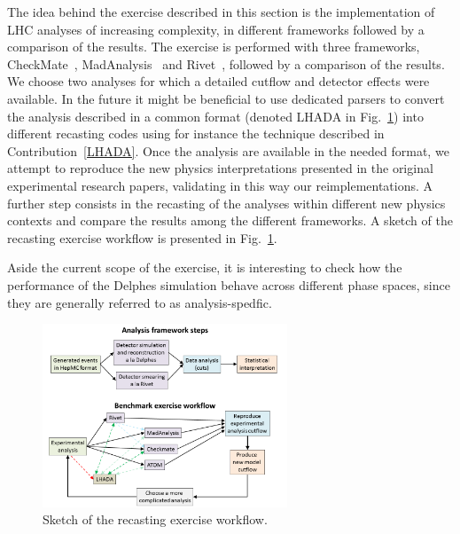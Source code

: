 \documentclass[11pt]{cernrep}
\begin{document}
The idea behind the exercise described in this section is the implementation of LHC analyses of increasing complexity, in different frameworks followed by a comparison of the results. The exercise is performed with three frameworks, CheckMate~\cite{Drees:2013wra,Cacciari:2005hq}, MadAnalysis~\cite{Conte:2012fm,Conte:2014zja,Dumont:2014tja} and Rivet~\cite{Waugh:2006ip,Buckley:2010ar}, followed by a comparison of the results. We choose two analyses for which a detailed cutflow and detector effects were available. In the future it might be beneficial to use dedicated parsers to convert the analysis described in a common format (denoted LHADA in Fig.~\ref{fig:exercise}) into different recasting codes using for instance the technique described in Contribution~\ref{LHADA}.
Once the analysis are available in the needed format, we attempt to reproduce the new physics
interpretations presented in the original experimental research papers,
validating in this way our reimplementations.
A further step consists in the recasting of the analyses within different new
physics contexts and compare the results among the different frameworks.
A sketch of the recasting exercise workflow is presented in Fig.~\ref{fig:exercise}.

Aside the current scope of the exercise, it is interesting to check how the performance of the Delphes simulation behave across different phase spaces, since they are generally referred to as analysis-spedfic.


\begin{figure}
\begin{center}
\includegraphics[width=0.65\textwidth]{figures/lhada_benchmarking_excersise.png}
 \caption{Sketch of the recasting exercise workflow.
}
\label{fig:exercise}
\end{center}
\end{figure}
\end{document}
